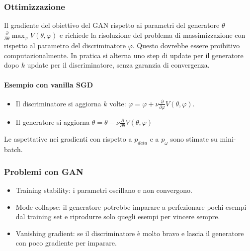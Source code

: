		\subsubsection{Ottimizzazione}
		Il gradiente del obiettivo del GAN rispetto ai parametri del generatore $\theta$ $\frac{\partial}{\partial\theta}\max_\varphi V(\theta,\varphi)$ e richiede la risoluzione del problema di massimizzazione con rispetto al parametro del discriminatore $\varphi$.
		Questo dovrebbe essere proibitivo computazionalmente.
		In pratica si alterna uno step di update per il generatore dopo $k$ update per il discriminatore, senza garanzia di convergenza.

			\paragraph{Esempio con vanilla SGD}
			\begin{multicols}{2}
				\begin{itemize}
					\item Il discriminatore si aggiorna $k$ volte: $\varphi = \varphi + \nu\frac{\partial}{\partial\varphi}V(\theta,\varphi)$.
					\item Il generatore si aggiorna $\theta = \theta-\nu\frac{\partial}{\partial\theta}V(\theta,\varphi)$
				\end{itemize}
			\end{multicols}
			Le aspettative nei gradienti con rispetto a $p_{data}$ e a $p_\omega$ sono stimate su mini-batch.

		\subsubsection{Problemi con GAN}
		\begin{itemize}
			\item Training stability: i parametri oscillano e non convergono.
			\item Mode collapse: il generatore potrebbe imparare a perfezionare pochi esempi dal training set e riprodurre solo quegli esempi per vincere sempre.
			\item Vanishing gradient: se il discriminatore \`e molto bravo e lascia il generatore con poco gradiente per imparare.
		\end{itemize}

